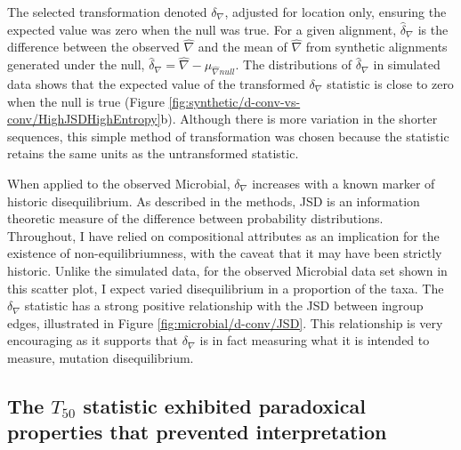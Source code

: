 

The selected transformation denoted $\delta_\nabla$, adjusted for location only, ensuring the expected value was zero when the null was true. For a given alignment, $\hat \delta_\nabla$ is the difference between the observed $\hat \nabla$ and the mean of $\hat \nabla$ from synthetic alignments generated under the null, $\hat \delta_\nabla =  \hat\nabla - \mu_{\hat \nabla{null}}.$ The distributions of $\hat \delta_\nabla$ in simulated data shows that the expected value of the transformed $\delta_\nabla$ statistic is close to zero when the null is true (Figure \ref{fig:synthetic/d-conv-vs-conv/HighJSDHighEntropy}b). Although there is more variation in the shorter sequences, this simple method of transformation was chosen because the statistic retains the same units as the untransformed statistic. 

When applied to the observed Microbial, $\delta_\nabla$ increases with a known marker of historic disequilibrium. As described in the methods, JSD is an information theoretic measure of the difference between probability distributions. Throughout, I have relied on compositional attributes as an implication for the existence of non-equilibriumness, with the caveat that it may have been strictly historic. Unlike the simulated data, for the observed Microbial data set shown in this scatter plot, I expect varied disequilibrium in a proportion of the taxa. The $\delta_\nabla$ statistic has a strong positive relationship with the JSD between ingroup edges, illustrated in Figure \ref{fig:microbial/d-conv/JSD}. This relationship is very encouraging as it supports that $\delta_\nabla$ is in fact measuring what it is intended to measure, mutation disequilibrium. 



\subsection{The $T_{50}$ statistic exhibited paradoxical properties that prevented interpretation}
\label{T50_results}


